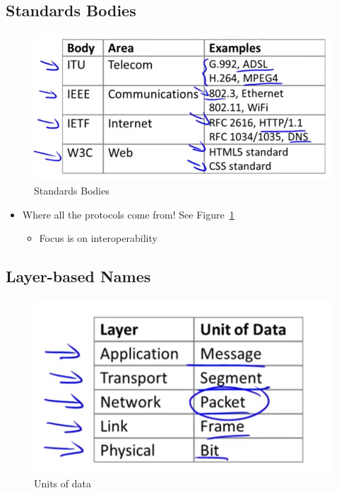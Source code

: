 \documentclass[12pt]{ctexart}   %
\begin{document}
	\subsection{Standards Bodies}
	
	 \begin{figure}[h!] %
	 \centering
	 \includegraphics[scale=0.7]{images/1-7-4}
	\caption{ Standards Bodies}
	 \label{fig:1-7-4}
	 \end{figure}
	 
	 \begin{itemize}
	 	\item Where all the protocols come from! See Figure~\ref{fig:1-7-4}
	 	\begin{itemize}
	 		\item Focus is on interoperability
	 	\end{itemize}
	 \end{itemize}
	 
	 \subsection{Layer-based Names}
	 
	 \begin{figure}[h!] %
	 \centering
	 \includegraphics[scale=0.7]{images/1-7-5}
	\caption{ Units of data}
	 \label{fig:1-7-5}
	 \end{figure}
	 
\end{document}
